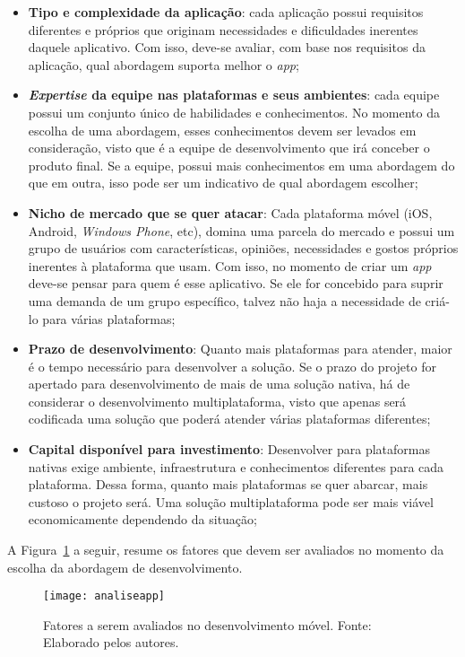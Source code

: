 \begin{itemize}
    \item \textbf{Tipo e complexidade da aplicação}: cada aplicação possui requisitos diferentes e próprios que originam necessidades e dificuldades inerentes daquele aplicativo. Com isso, deve-se avaliar,
    com base nos requisitos da aplicação, qual abordagem suporta melhor o \textit{app};
    \item \textbf{\textit{Expertise} da equipe nas plataformas e seus ambientes}: cada equipe possui um conjunto único de habilidades e conhecimentos. No momento da escolha de uma abordagem, esses conhecimentos
    devem ser levados em consideração, visto que é a equipe de desenvolvimento que irá conceber o produto final. Se a equipe, possui mais conhecimentos em uma abordagem do que em outra, isso pode ser 
    um indicativo de qual abordagem escolher;
    \item \textbf{Nicho de mercado que se quer atacar}: Cada plataforma móvel (iOS, Android, \textit{Windows Phone}, etc), domina uma parcela do mercado e possui um grupo de usuários com 
    características, opiniões, necessidades e gostos próprios inerentes à plataforma que usam. Com isso, no momento de criar um \textit{app} deve-se pensar para quem é esse aplicativo. Se ele for concebido 
    para suprir uma demanda de um grupo específico, talvez não haja a necessidade de criá-lo para várias plataformas;
    \item \textbf{Prazo de desenvolvimento}: Quanto mais plataformas para atender, maior é o tempo necessário para desenvolver a solução. Se o prazo do projeto for apertado para desenvolvimento de mais de uma solução 
    nativa, há de considerar o desenvolvimento multiplataforma, visto que apenas será codificada uma solução que poderá atender várias plataformas diferentes;
    \item \textbf{Capital disponível para investimento}: Desenvolver para plataformas nativas exige ambiente, infraestrutura e conhecimentos diferentes para cada plataforma. Dessa forma, quanto mais plataformas se 
    quer abarcar, mais custoso o projeto será. Uma solução multiplataforma pode ser mais viável economicamente dependendo da situação;
\end{itemize}

A Figura~\ref{fig:analiseapp} a seguir, resume os fatores que devem ser avaliados no momento da escolha da abordagem de desenvolvimento.
\begin{figure}[H]
  \centering
    \texttt{[image: analiseapp]}
    \caption[Fatores a serem avaliados no desenvolvimento móvel]{ Fatores a serem avaliados no desenvolvimento móvel. Fonte: Elaborado pelos autores.}
	\label{fig:analiseapp}
\end{figure}

